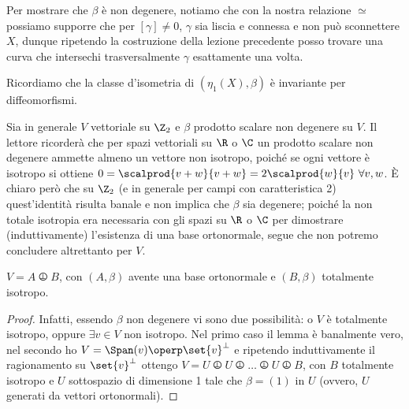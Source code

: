 Per mostrare che $\beta$ è non degenere, notiamo che con la nostra relazione $\simeq$ possiamo supporre che per $[\gamma] \neq 0$, $\gamma$ sia liscia e connessa e non può sconnettere $X$, dunque ripetendo la costruzione della lezione precedente posso trovare una curva che intersechi trasversalmente $\gamma$ esattamente una volta.


Ricordiamo che la classe d'isometria di $(\eta_1(X), \beta)$ è invariante per diffeomorfismi.

Sia in generale $V$ vettoriale su $\Z_2$ e $\beta$ prodotto scalare non degenere su $V$. Il lettore ricorderà che per spazi vettoriali su $\R$ o $\C$ un prodotto scalare non degenere ammette almeno un vettore non isotropo, poiché se ogni vettore è isotropo si ottiene $0 = \scalprod{v+w}{v+w} = 2\scalprod{w}{v} \ \forall v,w$. È chiaro però che su $\Z_2$ (e in generale per campi con caratteristica 2) quest'identità risulta banale e non implica che $\beta$ sia degenere; poiché la non totale isotropia era necessaria con gli spazi su $\R$ o $\C$ per dimostrare (induttivamente) l'esistenza di una base ortonormale, segue che non potremo concludere altrettanto per $V$.

\begin{lemma}[Lemma 1]
	$V = A \operp B$, con $(A, \beta)$ avente una base ortonormale e $(B, \beta)$ totalmente isotropo.
\end{lemma}
\begin{proof}
	Infatti, essendo $\beta$ non degenere vi sono due possibilità: o $V$ è totalmente isotropo, oppure $\exists v \in V$ non isotropo. Nel primo caso il lemma è banalmente vero, nel secondo ho $V = \Span(v) \operp \set{v}^\perp$ e ripetendo induttivamente il ragionamento su $\set{v}^\perp$ ottengo $V = U \operp U \operp \dots \operp U \operp B$, con $B$ totalmente isotropo e $U$ sottospazio di dimensione 1 tale che $\beta = (1)$ in $U$ (ovvero, $U$ generati da vettori ortonormali).
\end{proof}

